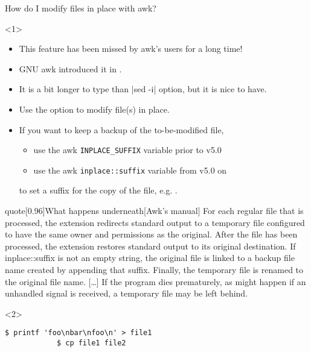 \begin{frame}[fragile]{How do I modify files in place with awk?}
    \vspace{-3mm}
    \begin{onlyenv}<1>
        \begin{itemize}
            \item This feature has been missed by awk's users for a long time!
            \item GNU awk introduced it in .
            \item It is a bit longer to type than \;\bash|sed -i|\; option, but it is nice to have.
            \item Use the \;\; option to modify file(s) in place.
            \item If you want to keep a backup of the to-be-modified file,
                  \begin{itemize}
                      \item use the awk \texttt{INPLACE\_SUFFIX} variable prior to v5.0
                      \item use the awk \texttt{inplace::suffix} variable from v5.0 on
                  \end{itemize}
                  to set a suffix for the copy of the file, e.g. .
        \end{itemize}
        \begin{varblock}{quote}[0.96\textwidth]{What happens underneath}[Awk's manual]
            For each regular file that is processed, the extension redirects standard output to a temporary file configured to have the same owner and permissions as the original.
            After the file has been processed, the extension restores standard output to its original destination.
            If inplace::suffix is not an empty string, the original file is linked to a backup file name created by appending that suffix.
            Finally, the temporary file is renamed to the original file name.
            [\ldots]
            If the program dies prematurely, as might happen if an unhandled signal is received, a temporary file may be left behind.
        \end{varblock}
    \end{onlyenv}
    \begin{onlyenv}<2>
        \begin{lstlisting}[style=myBash, numbers=none, aboveskip=2mm]
            $ printf 'foo\nbar\nfoo\n' > file1
            $ cp file1 file2

\end{lstlisting}
\end{onlyenv}
\end{frame}
